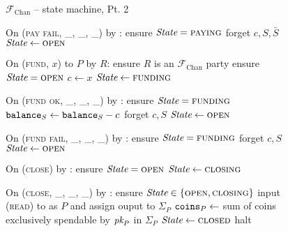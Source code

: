 \begin{figure}[H]
  \begin{systembox}{$\mathcal{F}_{\mathrm{Chan}}$ -- state machine, Pt. 2}
    \begin{algorithmic}[1]
      \State On (\textsc{pay fail}, \_, \_, \_) by \adversary:
      \Indent
        \State ensure $\itistate = \textsc{paying}$
        \State forget $c, S, \bar{S}$
        \State $\itistate \gets \textsc{open}$
      \EndIndent
      \Statex

      \State On (\textsc{fund}, $x$) to $P$ by $R$:
      \Indent
        \State ensure $R$ is an $\mathcal{F}_{\mathrm{Chan}}$ party
        \State ensure $\itistate = \textsc{open}$
        \State $c \gets x$
        \State $\itistate \gets \textsc{funding}$
      \EndIndent
      \Statex

      \State On (\textsc{fund ok}, \_, \_, \_) by \adversary:
      \Indent
        \State ensure $\itistate = \textsc{funding}$
        \State $\texttt{balance}_{S} \gets \texttt{balance}_{S} - c$
        \State forget $c, S$
        \State $\itistate \gets \textsc{open}$
      \EndIndent
      \Statex

      \State On (\textsc{fund fail}, \_, \_, \_) by \adversary:
      \Indent
        \State ensure $\itistate = \textsc{funding}$
        \State forget $c, S$
        \State $\itistate \gets \textsc{open}$
      \EndIndent
      \Statex

      \State On (\textsc{close}) by \environment:
      \Indent
        \State ensure $\itistate = \textsc{open}$
        \State $\itistate \gets \textsc{closing}$
      \EndIndent
      \Statex

      \State On (\textsc{close}, \_, \_, \_) by \adversary:
      \Indent
        \State ensure $\itistate \in \{\textsc{open}, \textsc{closing}\}$
            \State input (\textsc{read}) to \ledger as $P$ and assign ouput to
            $\Sigma_P$
            \State $\texttt{coins}_{P} \gets$ sum of coins exclusively spendable by
            $\textit{pk}_{P}$ in $\Sigma_P$
          \EndIf
        \EndFor
          \State $\itistate \gets \textsc{closed}$
        \Else \: 
          \State halt
        \EndIf
      \EndIndent
    \end{algorithmic}
  \end{systembox}
  \caption{}
  \label{code:functionality:state-machine-2}
\end{figure}
